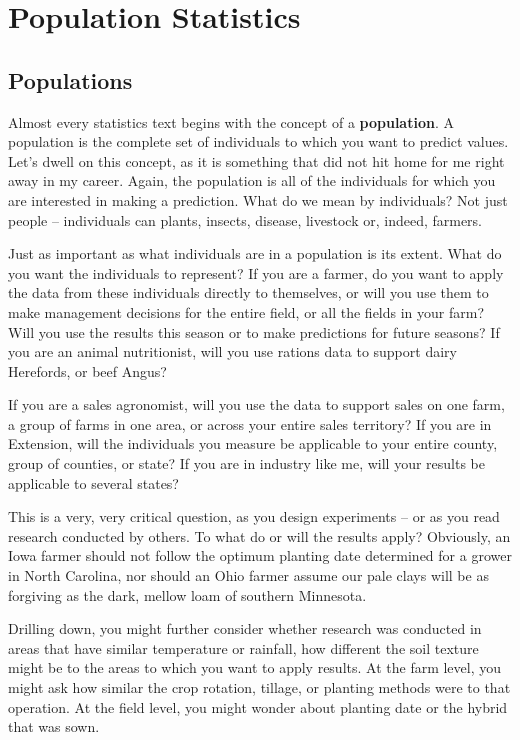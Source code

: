 \documentclass[
]{book}
\begin{document}
\hypertarget{population-statistics}{%
\chapter{Population Statistics}\label{population-statistics}}

\hypertarget{populations}{%
\section{Populations}\label{populations}}

Almost every statistics text begins with the concept of a
\textbf{population}. A population is the complete set of individuals to which
you want to predict values. Let's dwell on this concept, as it is
something that did not hit home for me right away in my career. Again,
the population is all of the individuals for which you are interested in
making a prediction. What do we mean by individuals? Not just people --
individuals can plants, insects, disease, livestock or, indeed, farmers.

Just as important as what individuals are in a population is its extent.
What do you want the individuals to represent? If you are a farmer, do
you want to apply the data from these individuals directly to
themselves, or will you use them to make management decisions for the
entire field, or all the fields in your farm? Will you use the results
this season or to make predictions for future seasons? If you are an
animal nutritionist, will you use rations data to support dairy
Herefords, or beef Angus?

If you are a sales agronomist, will you use the data to support sales on
one farm, a group of farms in one area, or across your entire sales
territory? If you are in Extension, will the individuals you measure be
applicable to your entire county, group of counties, or state? If you
are in industry like me, will your results be applicable to several
states?

This is a very, very critical question, as you design experiments -- or
as you read research conducted by others. To what do or will the results
apply? Obviously, an Iowa farmer should not follow the optimum planting
date determined for a grower in North Carolina, nor should an Ohio
farmer assume our pale clays will be as forgiving as the dark, mellow
loam of southern Minnesota.

Drilling down, you might further consider whether research was conducted
in areas that have similar temperature or rainfall, how different the
soil texture might be to the areas to which you want to apply results.
At the farm level, you might ask how similar the crop rotation, tillage,
or planting methods were to that operation. At the field level, you
might wonder about planting date or the hybrid that was sown.
\end{document}
